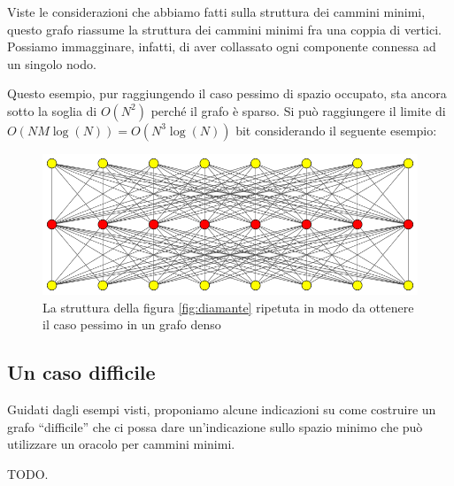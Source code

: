 \documentclass[a4paper,10pt]{amsbook}
\theoremstyle{plain}
\theoremstyle{definition}
\theoremstyle{remark}
\newcommand{\pa}[1]{\left(#1\right)}
\begin{document}
Viste le considerazioni che abbiamo fatti sulla struttura dei cammini
minimi, questo grafo riassume la struttura dei cammini minimi fra una
coppia di vertici. Possiamo immagginare, infatti, di aver collassato
ogni componente connessa ad un singolo nodo.

Questo esempio, pur raggiungendo il caso pessimo di spazio occupato,
sta ancora sotto la soglia di $O\pa{N^2}$ perch\'e il grafo \`e
sparso. Si pu\`o raggiungere il limite di $O\pa{ N M \log \pa{N} } =
O\pa{N^3 \log\pa{N}}$ bit considerando il seguente esempio:

\begin{figure}[H]
  \centering
  \includegraphics[width=1\textwidth]{diamantemultiplo}
  \caption{La struttura della figura \ref{fig:diamante} ripetuta in
    modo da ottenere il caso pessimo in un grafo denso}
  \label{fig:diamantemultiplo}
\end{figure}


\subsection{Un caso difficile}

Guidati dagli esempi visti, proponiamo alcune indicazioni su come
costruire un grafo ``difficile'' che ci possa dare un'indicazione
sullo spazio minimo che pu\`o utilizzare un oracolo per cammini
minimi.

TODO.








\end{document}
